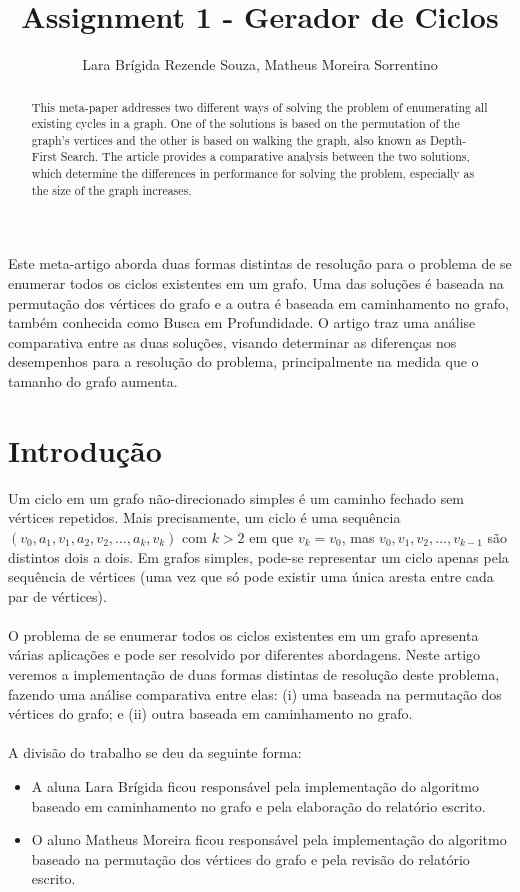 \documentclass[12pt]{article}
\title{Assignment 1 - Gerador de Ciclos}
\author{Lara Brígida Rezende Souza\inst{1}, Matheus Moreira Sorrentino\inst{2} }
\begin{document}
 

\maketitle

\begin{abstract}
  This meta-paper addresses two different ways of solving the problem of enumerating all existing cycles in a graph. One of the solutions is based on the permutation of the graph's vertices and the other is based on walking the graph, also known as Depth-First Search. The article provides a comparative analysis between the two solutions, which determine the differences in performance for solving the problem, especially as the size of the graph increases.
\end{abstract}
     
\begin{resumo} 
  Este meta-artigo aborda duas formas distintas de resolução para o problema de se enumerar todos os ciclos existentes em um grafo. Uma das soluções é baseada na permutação dos vértices do grafo e a outra é baseada em caminhamento no grafo, também conhecida como Busca em Profundidade. O artigo traz uma análise comparativa entre as duas soluções, visando determinar as diferenças nos desempenhos para a resolução do problema, principalmente na medida que o tamanho do grafo aumenta.
\end{resumo}


\section{Introdução}

Um ciclo em um grafo não-direcionado simples é um caminho fechado sem vértices repetidos. Mais precisamente, um ciclo é uma sequência $(v_0,a_1,v_1,a_2,v_2,...,a_k,v_k)$ com $k > 2$ em que $v_k = v_0$, mas $v_0,v_1,v_2,...,v_{k-1}$ são distintos dois a dois. Em grafos simples, pode-se representar um ciclo apenas pela sequência de vértices (uma vez que só pode existir uma única aresta entre cada par de vértices).
\\ \\
O problema de se enumerar todos os ciclos existentes em um grafo apresenta várias aplicações e pode ser resolvido por diferentes abordagens. Neste artigo veremos a implementação de duas formas distintas de resolução deste problema, fazendo uma análise comparativa entre elas: (i) uma baseada na permutação dos vértices do grafo; e (ii) outra baseada em caminhamento no grafo.
\\ \\
A divisão do trabalho se deu da seguinte forma: 
\begin{itemize}
    \item A aluna Lara Brígida ficou responsável pela implementação do algoritmo baseado em caminhamento no grafo e pela elaboração do relatório escrito. \\
    \item O aluno Matheus Moreira ficou responsável pela implementação do algoritmo baseado na permutação dos vértices do grafo e pela revisão do relatório escrito.
\end{itemize}
\end{document}
